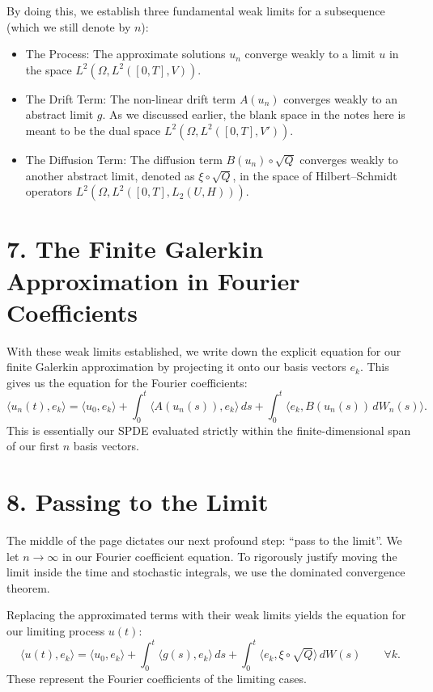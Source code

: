 \documentclass[11pt]{article}
\theoremstyle{definition}
\theoremstyle{remark}
\begin{document}
By doing this, we establish three fundamental weak limits for a subsequence (which we still denote by $n$):
\begin{itemize}
\item The Process: The approximate solutions $u_n$ converge weakly to a limit $u$ in the space $L^2(\Omega, L^2([0,T],V))$.
\item The Drift Term: The non-linear drift term $A(u_n)$ converges weakly to an abstract limit $g$. As we discussed earlier, the blank space in the notes here is meant to be the dual space $L^2(\Omega, L^2([0,T],V'))$.
\item The Diffusion Term: The diffusion term $B(u_n) \circ \sqrt{Q}$ converges weakly to another abstract limit, denoted as $\xi \circ \sqrt{Q}$, in the space of Hilbert--Schmidt operators $L^2(\Omega, L^2([0,T], L_2(U,H)))$.
\end{itemize}

\section*{7. The Finite Galerkin Approximation in Fourier Coefficients}
With these weak limits established, we write down the explicit equation for our finite Galerkin approximation by projecting it onto our basis vectors $e_k$. This gives us the equation for the Fourier coefficients:
\[
  \langle u_n(t), e_k \rangle = \langle u_0, e_k \rangle + \int_0^t \langle A(u_n(s)), e_k \rangle\,ds + \int_0^t \langle e_k, B(u_n(s))\,dW_n(s) \rangle.
\]
This is essentially our SPDE evaluated strictly within the finite-dimensional span of our first $n$ basis vectors.

\section*{8. Passing to the Limit}
The middle of the page dictates our next profound step: ``pass to the limit''. We let $n \to \infty$ in our Fourier coefficient equation. To rigorously justify moving the limit inside the time and stochastic integrals, we use the dominated convergence theorem.

Replacing the approximated terms with their weak limits yields the equation for our limiting process $u(t)$:
\[
  \langle u(t), e_k \rangle = \langle u_0, e_k \rangle + \int_0^t \langle g(s), e_k \rangle\,ds + \int_0^t \langle e_k, \xi \circ \sqrt{Q} \rangle\,dW(s) \qquad \forall k.
\]
These represent the Fourier coefficients of the limiting cases.
\end{document}
